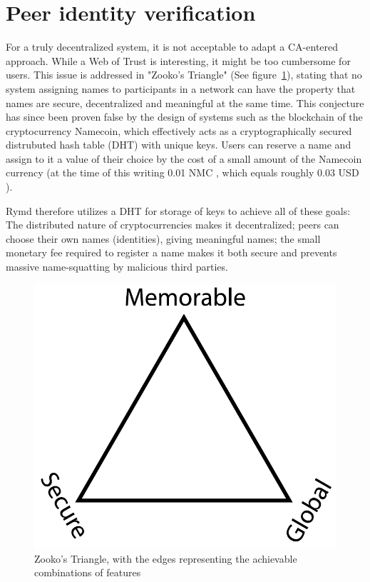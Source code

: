 \section{Peer identity verification}
\label{sec:authorization}
For a truly decentralized system, it is not acceptable to adapt a CA-entered approach. While a Web of Trust is interesting, it might be too cumbersome for users. This issue is addressed in "Zooko's Triangle" (See figure~\ref{fig:zooko}), stating that no system assigning names to participants in a network can have the property that names are secure, decentralized and meaningful at the same time. This conjecture has since been proven false by the design of systems such as the blockchain of the cryptocurrency Namecoin, which effectively acts as a cryptographically secured distrubuted hash table (DHT) with unique keys. Users can reserve a name and assign to it a value of their choice by the cost of a small amount of the Namecoin currency (at the time of this writing 0.01 NMC \cite{Namecoin:2014:Online}, which equals roughly 0.03 USD \cite{CryptoCoinCharts:2014:Online}).

Rymd therefore utilizes a DHT for storage of keys to achieve all of these goals: The distributed nature of cryptocurrencies makes it decentralized; peers can choose their own names (identities), giving meaningful names; the small monetary fee required to register a name makes it both secure and prevents massive name-squatting by malicious third parties.

\begin{figure}[h]
\centering
\includegraphics[width=\textwidth,height=0.2\paperheight,keepaspectratio
]{figures/Zooko_s_Triangle}
\caption{Zooko's Triangle, with the edges representing the achievable combinations of features \cite{Zooko:2001:Online}}
\label{fig:zooko}
\end{figure}

